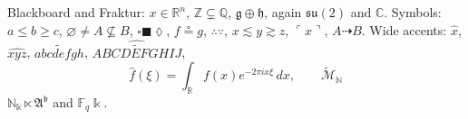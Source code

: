 \documentclass{article}
\begin{document}
Blackboard and Fraktur: $x\in\mathbb{R}^n$, $\mathbb{Z}\subsetneq\mathbb{Q}$, $\mathfrak{g}\oplus\mathfrak{h}$,
again $\mathfrak{su}(2)$ and $\mathbb{C}$.
Symbols: $a\leqslant b\geqslant c$, $\varnothing\ne A\nsubseteq B$, $\square\blacksquare\lozenge$,
$f\circeq g$, $\therefore\because$, $x\lesssim y\gtrsim z$, $\ulcorner x\urcorner$, $A\dashrightarrow B$.
Wide accents: $\widehat{x}$, $\widehat{xyz}$, $\widetilde{abcdefgh}$, $\widehat{\widetilde{ABCDEFGHIJ}}$,
\[ \widehat{f}(\xi)=\int_{\mathbb{R}}f(x)e^{-2\pi i x\xi}\,dx,\qquad \widetilde{\mathcal{M}}_{\mathbb{N}} \]
{\small $\mathbb{N}_{\mathbb{k}}\ltimes\mathfrak{A}^{\mathfrak{b}}$} and {\large $\mathbb{F}_q\Bbbk$}.
\end{document}
